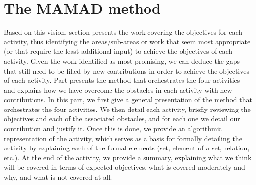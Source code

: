 \clearpage
\thispagestyle{empty}
\null
\newpage

\cleardoublepage
{}
\part{The MAMAD method}
\label{part:method}

\clearpage
\thispagestyle{empty}
\null
\newpage

Based on this vision, section  presents the work covering the objectives for each activity, thus identifying the areas/sub-areas or work that seem most appropriate (or that require the least additional input) to achieve the objectives of each activity. Given the work identified as most promising, we can deduce the gaps that still need to be filled by new contributions in order to achieve the objectives of each activity.
Part  presents the method that orchestrates the four activities and explains how we have overcome the obstacles in each activity with new contributions. In this part, we first give a general presentation of the method that orchestrates the four activities. We then detail each activity, briefly reviewing the objectives and each of the associated obstacles, and for each one we detail our contribution and justify it. Once this is done, we provide an algorithmic representation of the activity, which serves as a basis for formally detailing the activity by explaining each of the formal elements (set, element of a set, relation, etc.). At the end of the activity, we provide a summary, explaining what we think will be covered in terms of expected objectives, what is covered moderately and why, and what is not covered at all.
